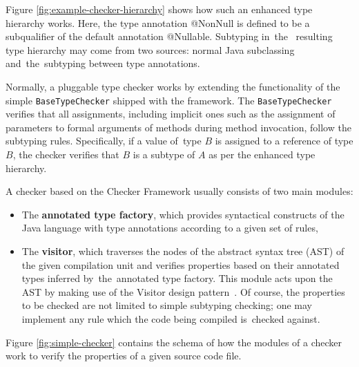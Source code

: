 \documentclass{pracamgr}
\theoremstyle{break}
\theoremstyle{break}
\theoremstyle{break}
\begin{document}
Figure \ref{fig:example-checker-hierarchy} shows how such an enhanced
type hierarchy works. Here, the type annotation @NonNull is defined to
be a subqualifier of the default annotation @Nullable. Subtyping
in~the~ resulting type hierarchy may come from two sources: normal
Java subclassing and~the~subtyping between type annotations.

Normally, a pluggable type checker works by extending the
functionality of the simple \texttt{BaseTypeChecker} shipped with the
framework. The \texttt{BaseTypeChecker} verifies that all assignments,
including implicit ones such as the assignment of parameters to formal
arguments of methods during method invocation, follow the subtyping
rules. Specifically, if a value of~type $B$ is assigned to a reference
of type $B$, the checker verifies that $B$ is a subtype of $A$ as per
the enhanced type hierarchy.

A checker based on the Checker Framework usually consists of two main
modules:
\begin{itemize}
\item The \textbf{annotated type factory}, which provides syntactical
  constructs of the Java language with type annotations according to a
  given set of rules,
\item The \textbf{visitor}, which traverses the nodes of the abstract
  syntax tree (AST) of the given compilation unit and verifies
  properties based on their annotated types inferred by~the~annotated
  type factory. This module acts upon the AST by making use of the
  Visitor design pattern~\cite{visitor1, visitor2}. Of course, the properties to
  be checked are not limited to simple subtyping checking; one may
  implement any rule which the code being compiled is~checked
  against.
\end{itemize}
Figure \ref{fig:simple-checker} contains the schema of how the modules
of a checker work to verify the properties of a given source code
file.
\end{document}
